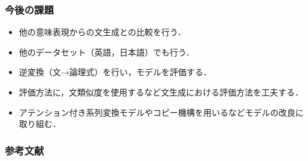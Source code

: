 \documentclass[dvipdfmx,cjk]{beamer}
\begin{document}
\begin{frame}
\frametitle{今後の課題}
\begin{itemize}
\item 他の意味表現からの文生成との比較を行う．
\item 他のデータセット（英語，日本語）でも行う．
\item 逆変換（文→論理式）を行い，モデルを評価する．
\item 評価方法に，文類似度を使用するなど文生成における評価方法を工夫する．
\item アテンション付き系列変換モデルやコピー機構を用いるなどモデルの改良に取り組む．


\end{itemize}

\end{frame}

\begin{frame}
\frametitle{参考文献}



\end{frame}


\end{document}
